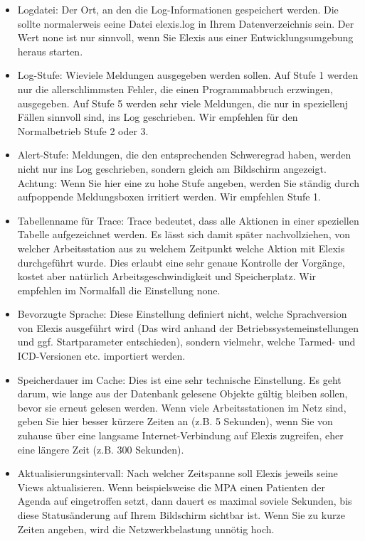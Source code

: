 \begin{itemize}
  \item Logdatei: Der Ort, an den die Log-Informationen gespeichert werden. Die
  sollte normalerweis eeine Datei \glqq elexis.log\grqq{} in Ihrem
  Datenverzeichnis sein. Der Wert \glqq none\grqq{} ist nur sinnvoll, wenn Sie
  Elexis aus einer Entwicklungsumgebung heraus starten.
  \item Log-Stufe: Wieviele Meldungen ausgegeben werden sollen. Auf Stufe 1
  werden nur die allerschlimmsten Fehler, die einen Programmabbruch erzwingen,
  ausgegeben. Auf Stufe 5 werden sehr viele Meldungen, die nur in speziellenj
  Fällen sinnvoll sind, ins Log geschrieben. Wir empfehlen für den Normalbetrieb
  Stufe 2 oder 3.
  \item Alert-Stufe: Meldungen, die den entsprechenden Schweregrad haben, werden
  nicht nur ins Log geschrieben, sondern gleich am Bildschirm angezeigt.
  Achtung: Wenn Sie hier eine zu hohe Stufe angeben, werden Sie ständig durch
  aufpoppende Meldungsboxen irritiert werden. Wir empfehlen Stufe 1.
  \item Tabellenname für Trace: Trace bedeutet, dass alle Aktionen in einer
  speziellen Tabelle aufgezeichnet werden. Es lässt sich damit später
  nachvollziehen, von welcher Arbeitsstation aus zu welchem Zeitpunkt welche
  Aktion mit Elexis durchgeführt wurde. Dies erlaubt eine sehr genaue Kontrolle
  der Vorgänge, kostet aber natürlich Arbeitsgeschwindigkeit und Speicherplatz.
  Wir empfehlen im Normalfall die Einstellung \glqq none\grqq{}.
  \item Bevorzugte Sprache: Diese Einstellung definiert nicht, welche
  Sprachversion von Elexis ausgeführt wird (Das wird anhand der
  Betriebssystemeinstellungen und ggf. Startparameter entschieden), sondern
  vielmehr, welche Tarmed- und ICD-Versionen etc. importiert werden.
  \item Speicherdauer im Cache: Dies ist eine sehr technische Einstellung. Es
  geht darum, wie lange aus der Datenbank gelesene Objekte gültig bleiben
  sollen, bevor sie erneut gelesen werden. Wenn
  viele Arbeitsstationen im Netz sind, geben Sie hier besser kürzere Zeiten an
  (z.B. 5 Sekunden), wenn Sie von zuhause über eine langsame Internet-Verbindung
  auf Elexis zugreifen, eher eine längere Zeit (z.B. 300 Sekunden).
  \item Aktualisierungsintervall: Nach welcher Zeitspanne soll Elexis jeweils
  seine Views aktualisieren. Wenn beispielsweise die MPA einen Patienten der
  Agenda auf \glqq eingetroffen\grqq{} setzt, dann dauert es maximal soviele
  Sekunden, bis diese Statusänderung auf Ihrem Bildschirm sichtbar ist. Wenn Sie
  zu kurze Zeiten angeben, wird die Netzwerkbelastung unnötig hoch.
\end{itemize}
